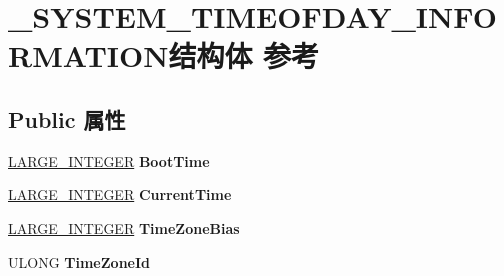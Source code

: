 \hypertarget{struct___s_y_s_t_e_m___t_i_m_e_o_f_d_a_y___i_n_f_o_r_m_a_t_i_o_n}{}\section{\+\_\+\+S\+Y\+S\+T\+E\+M\+\_\+\+T\+I\+M\+E\+O\+F\+D\+A\+Y\+\_\+\+I\+N\+F\+O\+R\+M\+A\+T\+I\+O\+N结构体 参考}
\label{struct___s_y_s_t_e_m___t_i_m_e_o_f_d_a_y___i_n_f_o_r_m_a_t_i_o_n}
\subsection*{Public 属性}
\begin{DoxyCompactItemize}
\item 
\mbox{\label{struct___s_y_s_t_e_m___t_i_m_e_o_f_d_a_y___i_n_f_o_r_m_a_t_i_o_n_a800df7030333764529ff3b26a09b9f37}} 
\hyperlink{union___l_a_r_g_e___i_n_t_e_g_e_r}{L\+A\+R\+G\+E\+\_\+\+I\+N\+T\+E\+G\+ER} {\bfseries Boot\+Time}
\item 
\mbox{\label{struct___s_y_s_t_e_m___t_i_m_e_o_f_d_a_y___i_n_f_o_r_m_a_t_i_o_n_ae6d6c72bb6f8c1cefd94a20d71b25605}} 
\hyperlink{union___l_a_r_g_e___i_n_t_e_g_e_r}{L\+A\+R\+G\+E\+\_\+\+I\+N\+T\+E\+G\+ER} {\bfseries Current\+Time}
\item 
\mbox{\label{struct___s_y_s_t_e_m___t_i_m_e_o_f_d_a_y___i_n_f_o_r_m_a_t_i_o_n_a57734c1158a9e736cf46d72ca2e056bf}} 
\hyperlink{union___l_a_r_g_e___i_n_t_e_g_e_r}{L\+A\+R\+G\+E\+\_\+\+I\+N\+T\+E\+G\+ER} {\bfseries Time\+Zone\+Bias}
\item 
\mbox{\label{struct___s_y_s_t_e_m___t_i_m_e_o_f_d_a_y___i_n_f_o_r_m_a_t_i_o_n_a814bcf8431ab31c49bfd2a43f08da801}} 
U\+L\+O\+NG {\bfseries Time\+Zone\+Id}
\item 
\mbox{\label{struct___s_y_s_t_e_m___t_i_m_e_o_f_d_a_y___i_n_f_o_r_m_a_t_i_o_n_affe65798eae651c53cf3f96e8a990423}} 

\end{DoxyCompactItemize}
